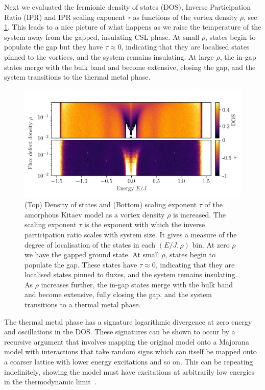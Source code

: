 Next we evaluated the fermionic density of states (DOS), Inverse Participation Ratio (IPR) and IPR scaling exponent \(\tau\) as functions of the vortex density \(\rho\), see \cref{fig:DOS_vs_rho}. This leads to a nice picture of what happens as we raise the temperature of the system away from the gapped, insulating CSL phase. At small \(\rho\), states begin to populate the gap but they have \(\tau\approx0\), indicating that they are localised states pinned to the vortices, and the system remains insulating. At large \(\rho\), the in-gap states merge with the bulk band and become extensive, closing the gap, and the system transitions to the thermal metal phase.

\hypertarget{fig:DOS_vs_rho}{%
\begin{figure}
\centering
\includegraphics[width=1\textwidth,height=\textheight]{figure_code/amk_chapter/results/DOS_vs_rho/DOS_vs_rho}
\caption[{Transition to a Thermal Metal}]{(Top) Density of states and (Bottom) scaling exponent \(\tau\) of the amorphous Kitaev model as a vortex density \(\rho\) is increased. The scaling exponent \(\tau\) is the exponent with which the inverse participation ratio scales with system size. It gives a measure of the degree of localisation of the states in each \((E/J, \rho)\) bin. At zero \(\rho\) we have the gapped ground state. At small \(\rho\), states begin to populate the gap. These states have \(\tau\approx0\), indicating that they are localised states pinned to fluxes, and the system remains insulating. As \(\rho\) increases further, the in-gap states merge with the bulk band and become extensive, fully closing the gap, and the system transitions to a thermal metal phase.}
\label{fig:DOS_vs_rho}
\end{figure}
}

The thermal metal phase has a signature logarithmic divergence at zero energy and oscillations in the DOS. These signatures can be shown to occur by a recursive argument that involves mapping the original model onto a Majorana model with interactions that take random signs which can itself be mapped onto a coarser lattice with lower energy excitations and so on. This can be repeating indefinitely, showing the model must have excitations at arbitrarily low energies in the thermodynamic limit~\autocite{bocquet_disordered_2000,selfThermallyInducedMetallic2019}.

